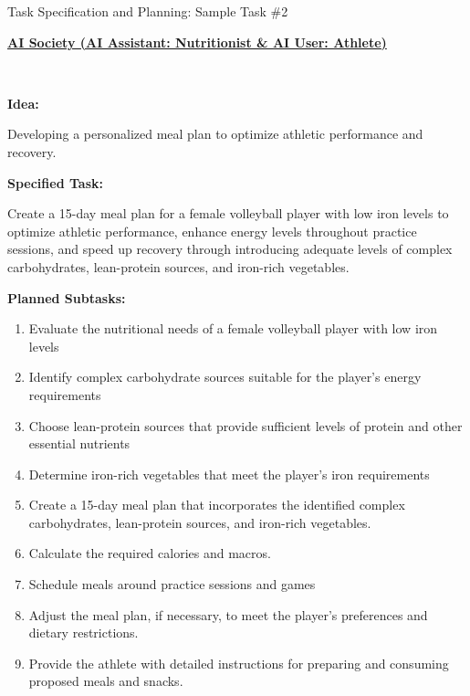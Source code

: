 \begin{AIBox}{Task Specification and Planning: Sample Task \#2}

	\parbox[t]{\textwidth}{
		{\bf\underline{AI Society (AI Assistant: Nutritionist
					\& AI User: Athlete)}}
	}\\

	\parbox[t]{\textwidth}{
		{\bf{Idea:}}

		Developing a personalized meal plan to optimize athletic performance and recovery.
		\\
	}
	\parbox[t]{\textwidth}{
		{\bf{Specified Task:}}

		Create a 15-day meal plan for a female volleyball player with low iron levels to optimize athletic performance, enhance energy levels throughout practice sessions, and speed up recovery through introducing adequate levels of complex carbohydrates, lean-protein sources, and iron-rich vegetables.
		\\}
	\parbox[t]{\textwidth}{
		{\bf{Planned Subtasks:}}
		\begin{enumerate}
			\item Evaluate the nutritional needs of a female volleyball player with low iron levels
			\item Identify complex carbohydrate sources suitable for the player's energy requirements
			\item Choose lean-protein sources that provide sufficient levels of protein and other essential nutrients
			\item Determine iron-rich vegetables that meet the player's iron requirements
			\item Create a 15-day meal plan that incorporates the identified complex carbohydrates, lean-protein sources, and iron-rich vegetables.
			\item Calculate the required calories and macros.
			\item Schedule meals around practice sessions and games
			\item Adjust the meal plan, if necessary, to meet the player's preferences and dietary restrictions.
			\item Provide the athlete with detailed instructions for preparing and consuming proposed meals and snacks.
		\end{enumerate}
	}

\end{AIBox}


